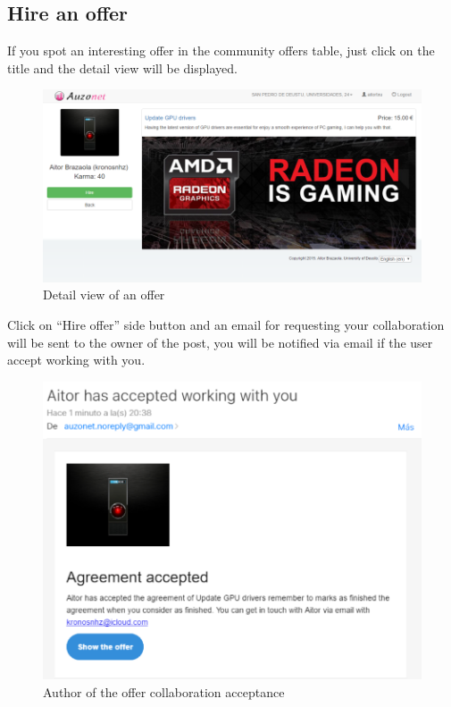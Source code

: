 \documentclass{DeustoFDP}
\begin{document}
\newpage
\subsection{Hire an offer}
If you spot an interesting offer in the community offers table, just click on the title and the detail view will be displayed. 

\begin{figure}[h!]
\centering
\includegraphics[width=0.9\linewidth]{fig/Manual/detailoffer}
\caption[Detail view of an offer]{Detail view of an offer}
\label{fig:detailoffer}
\end{figure}


Click on “Hire offer” side button and an email for requesting your collaboration will be sent to the owner of the post, you will be notified via email if the user accept working with you.

\begin{figure}[h!]
\centering
\includegraphics[width=0.9\linewidth]{fig/Manual/ownerconfirmation}
\caption[Author of the offer collaboration acceptance]{Author of the offer collaboration acceptance}
\label{fig:ownerconfirmation}
\end{figure}
\end{document}

